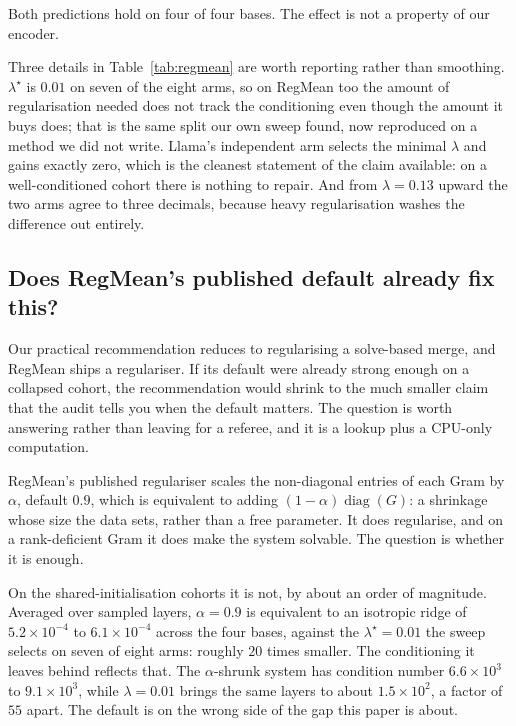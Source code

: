Both predictions hold on four of four bases. The effect is not a property
of our encoder.

Three details in Table~\ref{tab:regmean} are worth reporting rather than
smoothing. $\lambda^\star$ is $0.01$ on seven of the eight arms, so on
RegMean too the amount of regularisation needed does not track the
conditioning even though the amount it buys does; that is the same split
our own sweep found, now reproduced on a method we did not write. Llama's
independent arm selects the minimal $\lambda$ and gains exactly zero,
which is the cleanest statement of the claim available: on a
well-conditioned cohort there is nothing to repair. And from
$\lambda = 0.13$ upward the two arms agree to three decimals, because
heavy regularisation washes the difference out entirely.

\subsection{Does RegMean's published default already fix this?}
\label{subsec:regmean-default}

Our practical recommendation reduces to regularising a solve-based merge, and
RegMean ships a regulariser. If its default were already strong enough on a
collapsed cohort, the recommendation would shrink to the much smaller claim
that the audit tells you when the default matters. The question is worth
answering rather than leaving for a referee, and it is a lookup plus a
CPU-only computation.

RegMean's published regulariser scales the non-diagonal entries of each Gram
by $\alpha$, default $0.9$, which is equivalent to adding
$(1-\alpha)\operatorname{diag}(G)$: a shrinkage whose size the data sets,
rather than a free parameter. It does regularise, and on a rank-deficient Gram
it does make the system solvable. The question is whether it is enough.

On the shared-initialisation cohorts it is not, by about an order of
magnitude. Averaged over sampled layers, $\alpha = 0.9$ is equivalent to an
isotropic ridge of $5.2\times10^{-4}$ to $6.1\times10^{-4}$ across the four
bases, against the $\lambda^\star = 0.01$ the sweep selects on seven of eight
arms: roughly $20$ times smaller. The conditioning it leaves behind reflects
that. The $\alpha$-shrunk system has condition number $6.6\times10^{3}$ to
$9.1\times10^{3}$, while $\lambda = 0.01$ brings the same layers to about
$1.5\times10^{2}$, a factor of $55$ apart. The default is on the wrong side of
the gap this paper is about.

